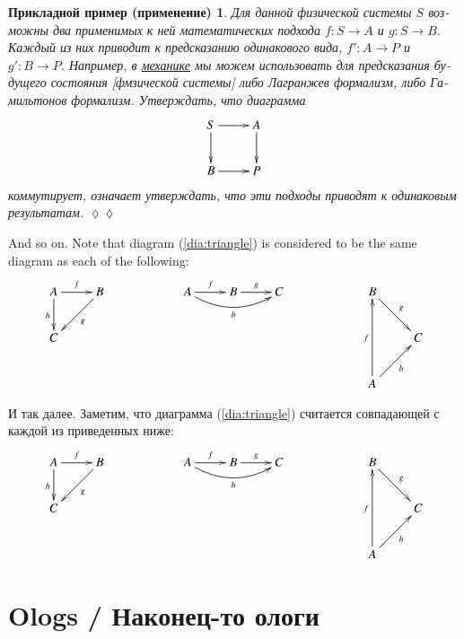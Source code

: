 \documentclass[a4paper]{book}
\def\to{\rightarrow}
\def\taking{\colon}
\theoremstyle{myth}
\newtheorem{appRUS}[envRUS]{Прикладной пример (применение)}
\newenvironment{applicationRUS}{\begin{appRUS}}{\hspace*{\fill}$\lozenge\lozenge$\end{appRUS}}
\begin{document}
\begin{russian}
\begin{applicationRUS}
Для данной физической системы $S$ возможны два применимых к ней математических подхода $f\taking S\to A$ и $g\taking S\to B$. Каждый из них приводит к предсказанию одинакового вида, $f'\taking A\to P$ и $g'\taking B\to P$. Например, в \href{https://ru.wikipedia.org/wiki/%D0%93%D0%B0%D0%BC%D0%B8%D0%BB%D1%8C%D1%82%D0%BE%D0%BD%D0%BE%D0%B2%D0%B0_%D0%BC%D0%B5%D1%85%D0%B0%D0%BD%D0%B8%D0%BA%D0%B0#.D0.9F.D0.B5.D1.80.D0.B5.D1.84.D0.BE.D1.80.D0.BC.D1.83.D0.BB.D0.B8.D1.80.D0.BE.D0.B2.D0.BA.D0.B0_.D0.BB.D0.B0.D0.B3.D1.80.D0.B0.D0.BD.D0.B6.D0.B5.D0.B2.D0.BE.D0.B9_.D0.BC.D0.B5.D1.85.D0.B0.D0.BD.D0.B8.D0.BA.D0.B8}{\text механике} мы можем использовать для предсказания будущего состояния [фмзической системы] либо Лагранжев формализм, либо Гамильтонов формализм. Утверждать, что диаграмма 
$$
\xymatrix{S\ar[r]\ar[d]&A\ar[d]\\B\ar[r]&P}
$$
коммутирует, означает утверждать, что эти подходы приводят к одинаковым результатам.
\end{applicationRUS}

And so on. Note that diagram (\ref{dia:triangle}) is considered to be the same diagram as each of the following:
$$
\xymatrix{A\ar[r]^f\ar[d]_h&B\ar[dl]^g\\C}\hspace{.8in}
\xymatrix{A\ar[r]^f\ar@/_1pc/[rr]_h&B\ar[r]^g&C}\hspace{.8in}
\xymatrix{B\ar[rd]^g\\&C\\A\ar[ru]_h\ar[uu]^f}$$
 
И так далее. Заметим, что диаграмма (\ref{dia:triangle}) считается совпадающей с каждой из приведенных ниже:
$$
\xymatrix{A\ar[r]^f\ar[d]_h&B\ar[dl]^g\\C}\hspace{.8in}
\xymatrix{A\ar[r]^f\ar@/_1pc/[rr]_h&B\ar[r]^g&C}\hspace{.8in}
\xymatrix{B\ar[rd]^g\\&C\\A\ar[ru]_h\ar[uu]^f}$$


\section{Ologs / Наконец-то ологи}\label{sec:ologs}


\end{russian}
\end{document}
